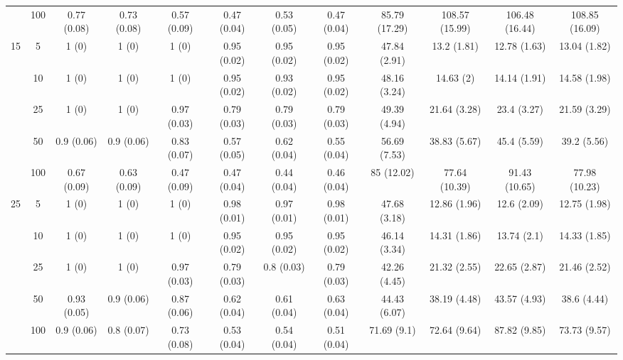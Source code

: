 \documentclass[11pt]{article}
\theoremstyle{definition}
\begin{document}
\begin{table}[H]
\begin{center}
{\begin{tabular}{cc|ccc|ccc|cccc|}
  & 100  & 0.77 (0.08) & 0.73 (0.08) & 0.57 (0.09) & 0.47 (0.04) & 0.53 (0.05) & 0.47 (0.04) & 85.79 (17.29) & 108.57 (15.99) & 106.48 (16.44) & 108.85 (16.09) \\[.3cm] 
 \multirow{5}{*}{15} & 5  & 1 (0) & 1 (0) & 1 (0) & 0.95 (0.02) & 0.95 (0.02) & 0.95 (0.02) & 47.84 (2.91) & 13.2 (1.81) & 12.78 (1.63) & 13.04 (1.82) \\ 
  & 10  & 1 (0) & 1 (0) & 1 (0) & 0.95 (0.02) & 0.93 (0.02) & 0.95 (0.02) & 48.16 (3.24) & 14.63 (2) & 14.14 (1.91) & 14.58 (1.98) \\ 
  & 25  & 1 (0) & 1 (0) & 0.97 (0.03) & 0.79 (0.03) & 0.79 (0.03) & 0.79 (0.03) & 49.39 (4.94) & 21.64 (3.28) & 23.4 (3.27) & 21.59 (3.29) \\ 
  & 50  & 0.9 (0.06) & 0.9 (0.06) & 0.83 (0.07) & 0.57 (0.05) & 0.62 (0.04) & 0.55 (0.04) & 56.69 (7.53) & 38.83 (5.67) & 45.4 (5.59) & 39.2 (5.56) \\ 
  & 100  & 0.67 (0.09) & 0.63 (0.09) & 0.47 (0.09) & 0.47 (0.04) & 0.44 (0.04) & 0.46 (0.04) & 85 (12.02) & 77.64 (10.39) & 91.43 (10.65) & 77.98 (10.23) \\[.3cm] 
 \multirow{5}{*}{25} & 5  & 1 (0) & 1 (0) & 1 (0) & 0.98 (0.01) & 0.97 (0.01) & 0.98 (0.01) & 47.68 (3.18) & 12.86 (1.96) & 12.6 (2.09) & 12.75 (1.98) \\ 
  & 10  & 1 (0) & 1 (0) & 1 (0) & 0.95 (0.02) & 0.95 (0.02) & 0.95 (0.02) & 46.14 (3.34) & 14.31 (1.86) & 13.74 (2.1) & 14.33 (1.85) \\ 
  & 25  & 1 (0) & 1 (0) & 0.97 (0.03) & 0.79 (0.03) & 0.8 (0.03) & 0.79 (0.03) & 42.26 (4.45) & 21.32 (2.55) & 22.65 (2.87) & 21.46 (2.52) \\ 
  & 50  & 0.93 (0.05) & 0.9 (0.06) & 0.87 (0.06) & 0.62 (0.04) & 0.61 (0.04) & 0.63 (0.04) & 44.43 (6.07) & 38.19 (4.48) & 43.57 (4.93) & 38.6 (4.44) \\ 
  & 100  & 0.9 (0.06) & 0.8 (0.07) & 0.73 (0.08) & 0.53 (0.04) & 0.54 (0.04) & 0.51 (0.04) & 71.69 (9.1) & 72.64 (9.64) & 87.82 (9.85) & 73.73 (9.57) \\  
\end{tabular}}
   \end{center}
      \vspace{-.5cm}
\end{table}
\end{document}
